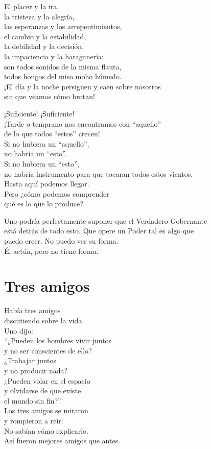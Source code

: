 \documentclass[hidelinks]{memoir}
\begin{document}
	El placer y la ira,\\
	la tristeza y la alegría,\\
	las esperanzas y los arrepentimientos,\\
	el cambio y la estabilidad,\\
	la debilidad y la decisión,\\
	la impaciencia y la haraganería:\\
	son todos sonidos de la misma flauta,\\
	todos hongos del miso moho húmedo.\\
	¡El día y la noche persiguen y caen sobre nosotros\\
	sin que veamos cómo brotan!
	
	¡Suficiente! ¡Suficiente!\\
	¡Tarde o temprano nos encontramos con ``aquello''\\
	de lo que todos ``estos'' crecen!\\
	Si no hubiera un ``aquello'',\\
	no habría un ``esto''.\\
	Si no hubiera un ``esto'',\\
	no habría instrumento para que tocaran todos estos vientos.\\
	Hasta aquí podemos llegar.\\
	Pero ¿cómo podemos comprender\\
	qué es lo que lo produce?
	
	Uno podría perfectamente suponer que el Verdadero Gobernante\\
	está detrás de todo esto. Que opere un Poder tal es algo que\\
	puedo creer. No puedo ver su forma.\\
	Él actúa, pero no tiene forma.
	
	\chapter*{Tres amigos}
	
	Había tres amigos\\
	discutiendo sobre la vida.\\
	Uno dijo:\\
	``¿Pueden los hombres vivir juntos\\
	y no ser conscientes de ello?\\
	¿Trabajar juntos\\
	y no producir nada?\\
	¿Pueden volar en el espacio\\
	y olvidarse de que existe\\
	el mundo sin fin?''\\
	Los tres amigos se miraron\\
	y rompieron a reír:\\
	No sabían cómo explicarlo.\\
	Así fueron mejores amigos que antes.
	
\end{document}
